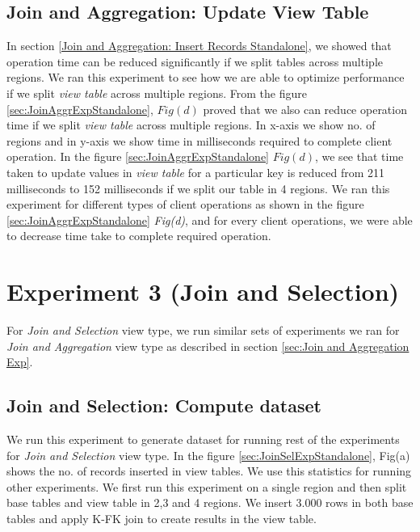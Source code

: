 \documentclass[11pt,a4paper,bibtotoc,idxtotoc,headsepline,footsepline,footexclude,BCOR12mm,DIV13]{scrbook}
\begin{document}
\subsection{Join and Aggregation: Update View Table} 
\label{Join and Aggr: Update View Table Standalone}

In section \ref{Join and Aggregation: Insert Records Standalone}, we showed that operation time can be reduced significantly if we split tables across multiple regions. We ran this experiment to see how we are able to optimize performance if we split \emph{view table} across multiple regions. From the figure \ref{sec:JoinAggrExpStandalone}, $Fig(d)$ proved that we also can reduce operation time if we split \emph{view table} across multiple regions. In x-axis we show no. of regions and in y-axis we show time in milliseconds required to complete client operation. In the figure \ref{sec:JoinAggrExpStandalone} $Fig(d)$, we see that time taken to update values in \emph{view table} for a particular key is reduced from 211 milliseconds to 152 milliseconds if we split our table in 4 regions. We ran this experiment for different types of client operations as shown in the figure \ref{sec:JoinAggrExpStandalone} \emph{Fig(d)}, and for every client operations, we were able to decrease time take to complete required operation.

\section{Experiment 3 (Join and Selection)}
\label{sec:Join and Selection Exp Standalone} 


For \emph{Join and Selection} view type, we run similar sets of experiments we ran for \emph{Join and Aggregation} view type as described in section \ref{sec:Join and Aggregation Exp}.

\subsection{Join and Selection: Compute dataset}
\label{Join and Selection: Insert records Standalone}

We run this experiment to generate dataset for running rest of the experiments for \emph{Join and Selection} view type. In the figure \ref{sec:JoinSelExpStandalone}, Fig(a) shows the no. of records inserted in view tables. We use this statistics for running other experiments. We first run this experiment on a single region and then split base tables and view table in 2,3 and 4 regions. We insert 3.000 rows in both base tables and apply K-FK join to create results in the view table.
\end{document}
